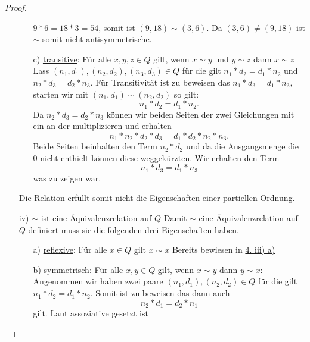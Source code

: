 \documentclass{exam}
\begin{document}
\begin{proof}
\begin{enumerate}
\begin{enumerate}
                        $9*6 = 18 * 3 = 54$, somit ist $(9,18) \sim (3,6)$.
                        Da $(3,6) \neq (9,18)$ ist $\sim$ somit nicht antisymmetrische.
                  \item [c)] \underline{transitive}: Für alle $x,y,z \in Q$ gilt, wenn $x \sim y$ und $y \sim z$ dann $x \sim z$ \newline
                        Lass $(n_1,d_1), (n_2,d_2), (n_3, d_3) \in Q$ für die gilt $n_1*d_2 = d_1*n_2$ und $n_2*d_3=d_2*n_3$.
                        Für Transitivität ist zu beweisen das $n_1*d_3=d_1*n_3$, starten wir mit $(n_1, d_1) \sim (n_2, d_2)$ so gilt: \[
                            n_1*d_2 = d_1*n_2.
                        \]
                        Da $n_2*d_3=d_2*n_3$ können wir beiden Seiten der zwei
                        Gleichungen mit ein an der multiplizieren und erhalten \[
                            n_1*n_2*d_2*d_3 = d_1*d_2*n_2*n_3.
                        \]
                        Beide Seiten beinhalten den Term $n_2*d_2$ und da die
                        Ausgangsmenge die $0$ nicht enthielt können diese
                        weggekürzten. Wir erhalten den Term \[
                            n_1*d_3 = d_1*n_3
                        \] was zu zeigen war. \checkmark
              \end{enumerate}
              Die Relation erfüllt somit nicht die Eigenschaften einer partiellen Ordnung.
        \item [iv)] $\sim$ ist eine Äquivalenzrelation auf $Q$ \newline
              Damit $\sim$ eine Äquivalenzrelation auf $Q$ definiert muss sie die folgenden drei Eigenschaften haben.
              \begin{enumerate}
                  \item [a)] \underline{reflexive}: Für alle $x \in Q$ gilt $x \sim x$ \newline
                        Bereits bewiesen in \underline{4. iii) a)}
                  \item [b)] \underline{symmetrisch}: Für alle $x,y \in Q$ gilt, wenn $x \sim y$ dann $y \sim x$: \newline
                        Angenommen wir haben zwei paare $(n_1,d_1),(n_2,d_2) \in Q$ für die gilt $n_1*d_2=d_1*n_2$.
                        Somit ist zu beweisen das dann auch \[
                            n_2*d_1 = d_2*n_1
                        \] gilt. \newline\newline Laut assoziative gesetzt ist

\end{enumerate}
\end{enumerate}
\end{proof}
\end{document}
